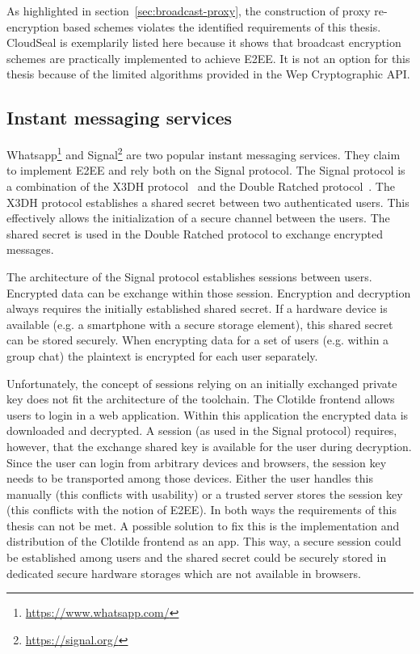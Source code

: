 \documentclass[../main.tex]{subfiles}
\begin{document}
As highlighted in section~\ref{sec:broadcast-proxy}, the construction of proxy re-encryption based schemes violates the identified requirements of this thesis.
CloudSeal is exemplarily listed here because it shows that broadcast encryption schemes are practically implemented to achieve E2EE.
It is not an option for this thesis because of the limited algorithms provided in the Wep Cryptographic API.

\subsection{Instant messaging services}
Whatsapp\footnote{\url{https://www.whatsapp.com/}} and Signal\footnote{\url{https://signal.org/}} are two popular instant messaging services.
They claim to implement E2EE and rely both on the Signal protocol.
The Signal protocol is a combination of the X3DH protocol~\cite{Marlinspike2016} and the Double Ratched protocol~\cite{Perrin2016}.
The X3DH protocol establishes a shared secret between two authenticated users.
This effectively allows the initialization of a secure channel between the users.
The shared secret is used in the Double Ratched protocol to exchange encrypted messages.~\cite{Marlinspike2016, Perrin2016}

The architecture of the Signal protocol establishes sessions between users.
Encrypted data can be exchange within those session.
Encryption and decryption always requires the initially established shared secret.
If a hardware device is available (e.g. a smartphone with a secure storage element), this shared secret can be stored securely. 
When encrypting data for a set of users (e.g. within a group chat) the plaintext is encrypted for each user separately.~\cite{Marlinspike2014}

Unfortunately, the concept of sessions relying on an initially exchanged private key does not fit the architecture of the toolchain.
The Clotilde frontend allows users to login in a web application.
Within this application the encrypted data is downloaded and decrypted.
A session (as used in the Signal protocol) requires, however, that the exchange shared key is available for the user during decryption.
Since the user can login from arbitrary devices and browsers, the session key needs to be transported among those devices.
Either the user handles this manually (this conflicts with usability) or a trusted server stores the session key (this conflicts with the notion of E2EE).
In both ways the requirements of this thesis can not be met.
A possible solution to fix this is the implementation and distribution of the Clotilde frontend as an app.
This way, a secure session could be established among users and the shared secret could be securely stored in dedicated secure hardware storages which are not available in browsers.
\end{document}
